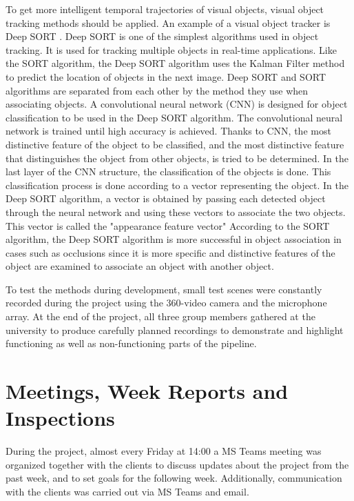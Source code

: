 To get more intelligent temporal trajectories of visual objects, visual object tracking methods should be applied. An example of a visual object tracker is Deep SORT \cite{deepsort}. Deep SORT is one of the simplest algorithms used in object tracking. It is used for tracking multiple objects in real-time applications. Like the SORT algorithm, the Deep SORT algorithm uses the Kalman Filter method to predict the location of objects in the next image. Deep SORT and SORT algorithms are separated from each other by the method they use when associating objects. A convolutional neural network (CNN) is designed for object classification to be used in the Deep SORT algorithm. The convolutional neural network is trained until high accuracy is achieved. Thanks to CNN, the most distinctive feature of the object to be classified, and the most distinctive feature that distinguishes the object from other objects, is tried to be determined. In the last layer of the CNN structure, the classification of the objects is done. This classification process is done according to a vector representing the object. In the Deep SORT algorithm, a vector is obtained by passing each detected object through the neural network and using these vectors to associate the two objects. This vector is called the "appearance feature vector" According to the SORT algorithm, the Deep SORT algorithm is more successful in object association in cases such as occlusions since it is more specific and distinctive features of the object are examined to associate an object with another object.

To test the methods during development, small test scenes were constantly recorded during the project using the 360-video camera and the microphone array. At the end of the project, all three group members gathered at the university to produce carefully planned recordings to demonstrate and highlight functioning as well as non-functioning parts of the pipeline.



\section{Meetings, Week Reports and Inspections}

During the project, almost every Friday at 14:00 a MS Teams meeting was organized together with the clients to discuss updates about the project from the past week, and to set goals for the following week. Additionally, communication with the clients was carried out via MS Teams and email.

